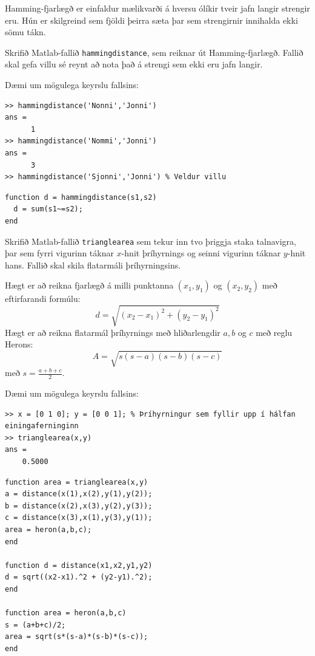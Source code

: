 \documentclass[addpoints]{exam}
\begin{document}
\begin{questions}
\begin{solution}
\end{solution}

\newpage
\question[10] Hamming-fjarlægð er einfaldur mælikvarði á hversu ólíkir tveir jafn langir strengir eru. Hún er skilgreind sem fjöldi þeirra sæta þar sem strengirnir innihalda ekki sömu tákn.

Skrifið Matlab-fallið \texttt{hammingdistance}, sem reiknar út Hamming-fjarlægð. Fallið skal gefa villu sé reynt að nota það á strengi sem ekki eru jafn langir.

Dæmi um mögulega keyrslu fallsins:
\begin{verbatim}
>> hammingdistance('Nonni','Jonni')
ans =
      1
>> hammingdistance('Nommi','Jonni')
ans =
      3
>> hammingdistance('Sjonni','Jonni') % Veldur villu
\end{verbatim}


\begin{solution}
 
\begin{verbatim}
function d = hammingdistance(s1,s2)
  d = sum(s1~=s2);
end
\end{verbatim}

\end{solution}

\newpage

\question[10] Skrifið Matlab-fallið \texttt{trianglearea} sem tekur inn tvo þriggja staka talnavigra, þar sem fyrri vigurinn táknar $x$-hnit þríhyrnings og seinni vigurinn táknar $y$-hnit hans. Fallið skal skila flatarmáli þríhyrningsins.

Hægt er að reikna fjarlægð á milli punktanna $(x_1,y_1)$ og $(x_2,y_2)$ með eftirfarandi formúlu:
\[
    d = \sqrt{(x_2-x_1)^2 + (y_2-y_1)^2}
\]
Hægt er að reikna flatarmál þríhyrnings með hliðarlengdir $a,b$ og $c$ með reglu Herons:
\[
    A = \sqrt{s(s-a)(s-b)(s-c)}
\]
með $s=\frac{a+b+c}{2}$.

Dæmi um mögulega keyrslu fallsins:
\begin{verbatim}
>> x = [0 1 0]; y = [0 0 1]; % Þríhyrningur sem fyllir upp í hálfan einingaferninginn
>> trianglearea(x,y)
ans =
    0.5000
\end{verbatim}

\begin{solution}
\begin{verbatim}
function area = trianglearea(x,y)
a = distance(x(1),x(2),y(1),y(2));
b = distance(x(2),x(3),y(2),y(3));
c = distance(x(3),x(1),y(3),y(1));
area = heron(a,b,c);
end

function d = distance(x1,x2,y1,y2)
d = sqrt((x2-x1).^2 + (y2-y1).^2);
end

function area = heron(a,b,c)
s = (a+b+c)/2;
area = sqrt(s*(s-a)*(s-b)*(s-c));
end
\end{verbatim}
\end{solution}

\end{questions}
\end{document}
